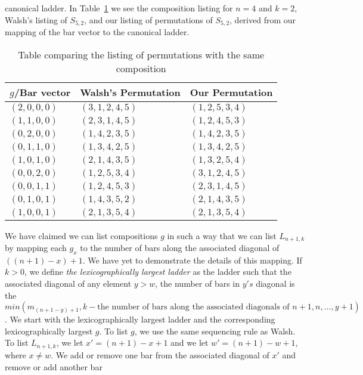  canonical ladder. 
 In Table~\ref{Table:diffPermsSameComp} we see the composition listing for $n=4$ and $k=2$, 
 Walsh's listing of $S_{5,2}$, and our listing of permutations of $S_{5,2}$, derived from our mapping of the bar vector to the canonical ladder. 
 \begin{table}[h]
  \centering
  \begin{tabular}{|p{4cm}|p{4cm}|p{4cm}|}
    
    \hline 
    $g$/Bar vector & Walsh's Permutation & Our Permutation \\ 
    \hline 
    \hline 
    $(2,0,0,0)$ & $(3,1,2,4,5)$ & $(1,2,5,3,4)$ \\ 
    \hline 
    $(1,1,0,0)$ & $(2,3,1,4,5)$ & $(1,2,4,5,3)$ \\ 
    \hline 
    $(0,2,0,0)$ & $(1,4,2,3,5)$ & $(1,4,2,3,5)$ \\ 
    \hline 
    $(0,1,1,0)$ & $(1,3,4,2,5)$ & $(1,3,4,2,5)$ \\ 
    \hline 
    $(1,0,1,0)$ & $(2,1,4,3,5)$ & $(1,3,2,5,4)$ \\ 
    \hline 
    $(0,0,2,0)$ & $(1,2,5,3,4)$ & $(3,1,2,4,5)$\\ 
    \hline 
    $(0,0,1,1)$ & $(1,2,4,5,3)$ & $(2,3,1,4,5)$ \\ 
    \hline 
    $(0,1,0,1)$ & $(1,4,3,5,2)$ & $(2,1,4,3,5)$ \\ 
    \hline 
    $(1,0,0,1)$ & $(2,1,3,5,4)$ & $(2,1,3,5,4)$ \\ 
    \hline 

  \end{tabular}
  \caption{Table comparing the listing of permutations with the same composition}
  \label{Table:diffPermsSameComp}
 \end{table}
We have claimed we can list compositions $g$ in such a way that we can list $L_{n+1,k}$ by mapping each $g_{x}$ to the number of bars along the associated diagonal 
of $((n+1)-x)+1$. We have yet to demonstrate the details of this mapping. If $k>0$, we define \emph{the lexicographically largest ladder} as the 
ladder such that the associated diagonal of any element $y>w$, the number of bars in $y's$ diagonal is the $min(m_{(n+1-y)+1}, k-\text{the number of bars along the associated diagonals of } n+1,n,\dots,y+1)$.
 We start with the lexicographically largest ladder and the corresponding lexicographically largest $g$. To list $g$, we use the same 
 sequencing rule as Walsh. To list $L_{n+1, k}$, we let $x'=(n+1)-x+1$ and we let $w'=(n+1)-w+1$, where $x \neq w$. We add or remove one bar from the associated diagonal of $x'$ and remove or add another bar 

